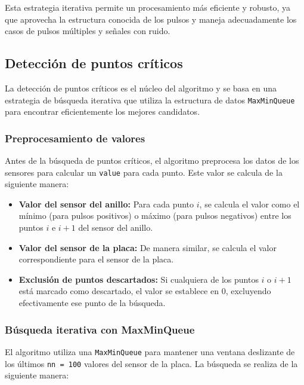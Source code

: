 \documentclass[12pt,a4paper]{article}
\begin{document}
Esta estrategia iterativa permite un procesamiento más eficiente y robusto, ya que aprovecha la estructura conocida de los pulsos y maneja adecuadamente los casos de pulsos múltiples y señales con ruido.

\subsection{Detección de puntos críticos}

La detección de puntos críticos es el núcleo del algoritmo y se basa en una estrategia de búsqueda iterativa que utiliza la estructura de datos \texttt{MaxMinQueue} para encontrar eficientemente los mejores candidatos.

\subsubsection{Preprocesamiento de valores}

Antes de la búsqueda de puntos críticos, el algoritmo preprocesa los datos de los sensores para calcular un \texttt{value} para cada punto. Este valor se calcula de la siguiente manera:

\begin{itemize}
    \item \textbf{Valor del sensor del anillo:} Para cada punto $i$, se calcula el valor como el mínimo (para pulsos positivos) o máximo (para pulsos negativos) entre los puntos $i$ e $i+1$ del sensor del anillo.
    
    \item \textbf{Valor del sensor de la placa:} De manera similar, se calcula el valor correspondiente para el sensor de la placa.
    
    \item \textbf{Exclusión de puntos descartados:} Si cualquiera de los puntos $i$ o $i+1$ está marcado como descartado, el valor se establece en 0, excluyendo efectivamente ese punto de la búsqueda.
\end{itemize}

\subsubsection{Búsqueda iterativa con MaxMinQueue}

El algoritmo utiliza una \texttt{MaxMinQueue} para mantener una ventana deslizante de los últimos \texttt{nn = 100} valores del sensor de la placa. La búsqueda se realiza de la siguiente manera:
\end{document}
